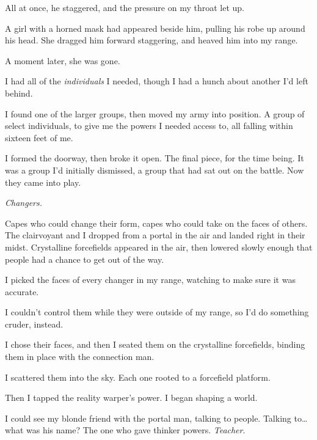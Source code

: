 All at once, he staggered, and the pressure on my throat let up.



A girl with a horned mask had appeared beside him, pulling his robe up around his head.  She dragged him forward staggering, and heaved him into my range.



A moment later, she was gone.



I had all of the \emph{individuals} I needed, though I had a hunch about another I'd left behind.



I found one of the larger groups, then moved my army into position.  A group of select individuals, to give me the powers I needed access to, all falling within sixteen feet of me.



I formed the doorway, then broke it open.  The final piece, for the time being.  It was a group I'd initially dismissed, a group that had sat out on the battle.  Now they came into play.



\emph{Changers.}



Capes who could change their form, capes who could take on the faces of others.  The clairvoyant and I dropped from a portal in the air and landed right in their midst.  Crystalline forcefields appeared in the air, then lowered slowly enough that people had a chance to get out of the way.



I picked the faces of every changer in my range, watching to make sure it was accurate.



I couldn't control them while they were outside of my range, so I'd do something cruder, instead.



I chose their faces, and then I seated them on the crystalline forcefields, binding them in place with the connection man.



I scattered them into the sky.  Each one rooted to a forcefield platform.



Then I tapped the reality warper's power.  I began shaping a world.



I could see my blonde friend with the portal man, talking to people.  Talking to\ldots what was his name?  The one who gave thinker powers.  \emph{Teacher}.



